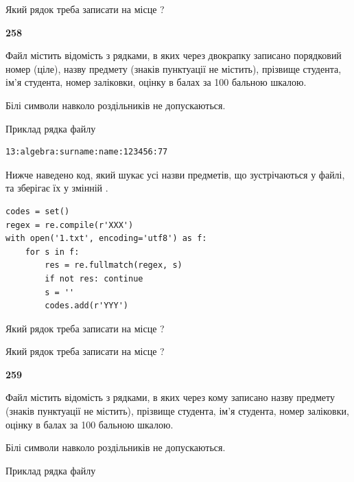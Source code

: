 Який рядок треба записати на місце  ?\par


\newpage

{\begin {center}\textbf{ 258}\end {center}}\par
Файл  містить відомість з рядками, в яких через двокрапку записано поряд\-ковий номер (ціле), назву предмету (знаків пунктуації не містить), прізвище студента, ім'я студента, номер заліковки, оцінку в балах за 100 бальною шкалою.

Білі символи навколо роздільників не допускаються.

Приклад рядка файлу



\begin{verbatim}
13:algebra:surname:name:123456:77
\end{verbatim}


Нижче наведено код, який шукає усі назви предметів, що зустрічаються у файлі, та зберігає їх у змінній .



\begin{verbatim}
codes = set()
regex = re.compile(r'XXX')
with open('1.txt', encoding='utf8') as f:
    for s in f:
        res = re.fullmatch(regex, s)
        if not res: continue
        s = ''
        codes.add(r'YYY')
\end{verbatim}





Який рядок треба записати на місце  ?\par
\vspace{5mm}


Який рядок треба записати на місце  ?\par


\newpage

{\begin {center}\textbf{ 259}\end {center}}\par
Файл  містить відомість з рядками, в яких через кому записа\-но назву предмету (знаків пунктуації не містить), прізвище студента, ім'я студента, номер залі\-ков\-ки, оцінку в балах за 100 бальною шкалою.

Білі символи навколо роздільників не допускаються.

Приклад рядка файлу



